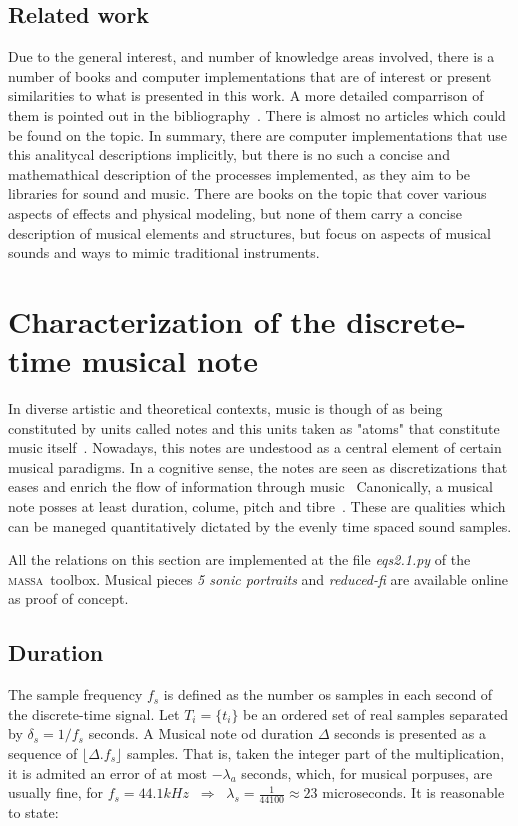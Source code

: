 \documentclass[
 aip,
 jmp,
 amsmath,amssymb,
 reprint,
]{revtex4-1}
\newcommand{\massa}{{\large \textsc{massa}}}
\begin{document}
\subsection{Related work}
Due to the general interest, and number of knowledge areas involved, there is a number of books and computer implementations that are of interest or present similarities to what is presented in this work. A more detailed comparrison of them is pointed out in the bibliography~\cite{dissertacao}. There is almost no articles which could be found on the topic. In summary, there are computer implementations that use this analitycal descriptions implicitly, but there is no such a concise and mathemathical description of the processes implemented, as they aim to be libraries for sound and music. There are books on the topic that cover various aspects of effects and physical modeling, but none of them carry a concise description of musical elements and structures, but focus on aspects of musical sounds and ways to mimic traditional instruments.


\section{Characterization of the discrete-time musical note}
In diverse artistic and theoretical contexts, music is though of as being constituted by units called notes and this units taken as "atoms" that constitute music itself~\cite{Wisnick, Lovelock, Webern}.
Nowadays, this notes are undestood as a central element of certain musical paradigms. In a cognitive sense, the notes are seen as discretizations that eases and enrich the flow of information through music~\cite{Roederer, Lacerda}
Canonically, a musical note posses at least duration, colume, pitch and tibre~\cite{Lacerda}. These are qualities which can be maneged quantitatively dictated by the evenly time spaced sound samples.

All the relations on this section are implemented at the file \emph{eqs2.1.py} of the \massa\ toolbox. Musical pieces \emph{5 sonic portraits} and \emph{reduced-fi} are available online as proof of concept.

\subsection{Duration}
The sample frequency $f_s$ is defined as the number os samples in each second of the discrete-time signal. Let $T_i=\{t_i\}$ be an ordered set of real samples separated by $\delta_s=1/f_s$ seconds. A Musical note od duration $\Delta$ seconds is presented as a sequence of $\lfloor \Delta . f_s \rfloor $ samples. That is, taken the integer part of the multiplication, it is admited an error of at most $-\lambda_a$ seconds, which, for musical porpuses, are usually fine, for $f_s=44.1kHz \;\;\Rightarrow\;\;\lambda_s=\frac{1}{44100}\approx 23$ microseconds. It is reasonable to state:
\end{document}

